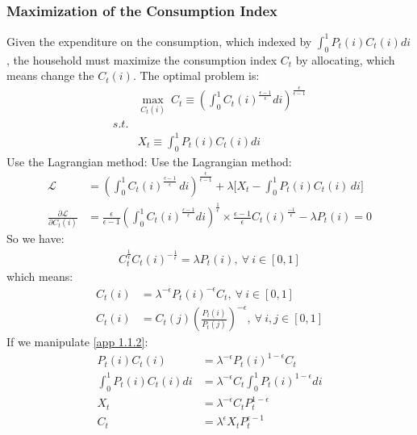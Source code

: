 \documentclass{article}
\numberwithin{equation}{section}
\begin{document}
\subsubsection{Maximization of the Consumption Index}
Given the expenditure on the consumption, which indexed by $\int^1_0 P_t(i)C_t(i)di$, the household must maximize the consumption index $C_t$ by allocating, which means change the $C_t(i)$. The optimal problem is:
	\begin{align*}
		&\mathop{max}\limits_{C_t(i)}\ C_t \equiv (\int^1_0 C_t(i)^{\frac{\epsilon-1}{\epsilon}}di)^{\frac{\epsilon}{\epsilon-1}}\\
		s.t.&\\
		&X_t \equiv \int^1_0 P_t(i)C_t(i)di
	\end{align*}
Use the Lagrangian method:
Use the Lagrangian method:
	\begin{align*}
	    \mathscr{L} &= \left(\int^1_0 C_t(i)^{\frac{\epsilon-1}{\epsilon}} \, di\right)^{\frac{\epsilon}{\epsilon-1}} 
	    + \lambda \bigg[X_t - \int^1_0 P_t(i)C_t(i) \, di\bigg] \\
	    \frac{\partial \mathscr{L}}{\partial C_t(i)} &= \frac{\epsilon}{\epsilon - 1} 
	    \left(\int^1_0 C_t(i)^{\frac{\epsilon-1}{\epsilon}} di\right)^{\frac{1}{\epsilon}} 
	    \times \frac{\epsilon - 1}{\epsilon} C_t(i)^{\frac{-1}{\epsilon}} - \lambda P_t(i) = 0
	\end{align*}
So we have:
	\begin{align}
		C_t^{\frac{1}{\epsilon}} C_t(i)^{-\frac{1}{\epsilon}} = \lambda P_t(i),\ \forall\ i \in [0, 1] \label{app 1.1.1}
	\end{align}
which means:
	\begin{align}
		C_t(i) &= \lambda^{-\epsilon} P_t(i)^{-\epsilon} C_t,\ \forall\ i \in [0, 1] \label{app 1.1.2}\\
		C_t(i) &= C_t(j) \left(\frac{P_t(i)}{P_t(j)}\right)^{-\epsilon},\ \forall\ i,j \in [0, 1] \label{app 1.1.3}
	\end{align}
If we manipulate \eqref{app 1.1.2}:
	\begin{align}
		P_t(i)C_t(i) &= \lambda^{-\epsilon}P_t(i)^{1-\epsilon}C_t \nonumber\\
		\int^1_0 P_t(i)C_t(i) di &= \lambda^{-\epsilon} C_t \int^1_0 P_t(i)^{1-\epsilon} di \nonumber\\
		X_t &= \lambda^{-\epsilon} C_t P_t^{1-\epsilon} \nonumber\\
		C_t &= \lambda^{\epsilon} X_t P^{\epsilon-1}_t \label{app 1.1.4}
	\end{align}
\end{document}
